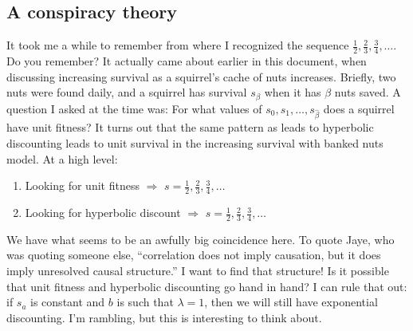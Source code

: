 \subsection{A conspiracy theory}
It took me a while to remember from where I recognized the sequence $\frac{1}{2}, \frac{2}{3}, \frac{3}{4}, \ldots$. Do you remember?
It actually came about earlier in this document, when discussing increasing survival as a squirrel's cache of nuts increases. 
Briefly, two nuts were found daily, and a squirrel has survival $s_{\beta}$ when it has $\beta$ nuts saved. A question I asked at 
the time was: For what values of $s_0, s_1, \ldots, s_{\hat \beta}$ does a squirrel have unit fitness? It turns out that
the same pattern as leads to hyperbolic discounting leads to unit survival in the increasing survival with banked nuts model. 
At a high level:
\begin{enumerate}
    \item Looking for unit fitness $\Rightarrow$ $s = \frac{1}{2}, \frac{2}{3}, \frac{3}{4}, \ldots$
    \item Looking for hyperbolic discount $\Rightarrow$ $s = \frac{1}{2}, \frac{2}{3}, \frac{3}{4}, \ldots$
\end{enumerate}
We have what seems to be an awfully big coincidence here. To quote Jaye, who was quoting someone else, ``correlation does not
imply causation, but it does imply unresolved causal structure.'' I want to find that structure! Is it possible that unit
fitness and hyperbolic discounting go hand in hand? I can rule that out: if $s_a$ is constant and $b$ is such that $\lambda = 1$,
then we will still have exponential discounting. I'm rambling, but this is interesting to think about.




